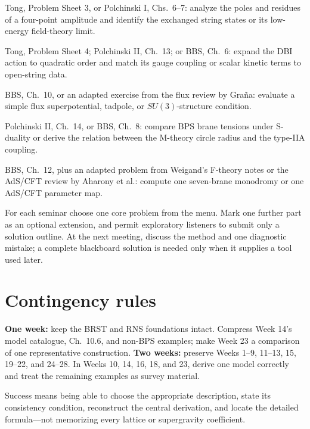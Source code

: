 \documentclass[11pt]{article}
\begin{document}
\begin{description}[leftmargin=2.1cm,labelwidth=1.55cm,labelsep=0.35cm,align=left,itemsep=4pt]
  \item[Week 24] Tong, Problem Sheet 3, or Polchinski I, Chs.~6--7: analyze the
  poles and residues of a four-point amplitude and identify the exchanged
  string states or its low-energy field-theory limit.

  \item[Week 25] Tong, Problem Sheet 4; Polchinski II, Ch.~13; or BBS, Ch.~6:
  expand the DBI action to quadratic order and
  match its gauge coupling or scalar kinetic terms to open-string data.

  \item[Week 26] BBS, Ch.~10, or an adapted exercise from the flux review by
  Gra\~na: evaluate a simple flux
  superpotential, tadpole, or $SU(3)$-structure condition.

  \item[Week 27] Polchinski II, Ch.~14, or BBS,
  Ch.~8: compare BPS brane tensions under S-duality or derive the relation
  between the M-theory circle radius and the type-IIA coupling.

  \item[Week 28] BBS, Ch.~12, plus an adapted
  problem from Weigand's F-theory notes or the AdS/CFT review by Aharony et al.:
  compute one seven-brane monodromy or one AdS/CFT parameter map.
\end{description}

\begin{warningbox}
For each seminar choose one core problem from the menu.  Mark one further part
as an optional extension, and permit exploratory listeners to submit only a
solution outline.  At the next meeting, discuss the method and one diagnostic
mistake; a complete blackboard solution is needed only when it supplies a tool
used later.
\end{warningbox}

\section{Contingency rules}

\begingroup\small

\begin{warningbox}
\textbf{One week:} keep the BRST and RNS foundations intact.  Compress Week 14's
model catalogue, Ch.~10.6, and non-BPS examples; make Week 23 a comparison of
one representative construction.  \textbf{Two weeks:} preserve Weeks 1--9,
11--13, 15, 19--22, and 24--28.  In Weeks 10, 14, 16, 18, and 23, derive one
model correctly and treat the remaining examples as survey material.
\end{warningbox}

\begin{checkpoint}
Success means being able to choose the appropriate description, state its
consistency condition, reconstruct the central derivation, and locate the
detailed formula---not memorizing every lattice or supergravity coefficient.
\end{checkpoint}
\endgroup
\end{document}
